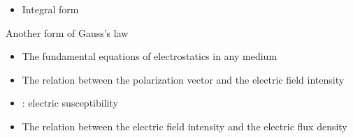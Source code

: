 \begin{ELjoin}

\begin{itemize}
\tightlist
\item
  Integral form
\end{itemize}


\begin{ELimportant}{Another form of Gauss's law}


\end{ELimportant}

\end{ELjoin}

\begin{ELjoin}

\begin{itemize}
\tightlist
\item
  The fundamental equations of electrostatics in any medium
\end{itemize}

\begin{ELimportant}{}


\end{ELimportant}

\end{ELjoin}

\ELhold


\begin{ELjoin}

\begin{itemize}
\tightlist
\item
  The relation between the polarization vector and the electric field intensity
\end{itemize}


\begin{itemize}
\item
  : electric susceptibility
\item
  The relation between the electric field intensity and the electric flux density
\end{itemize}

\begin{ELimportant}{}


\end{ELimportant}

\end{ELjoin}

